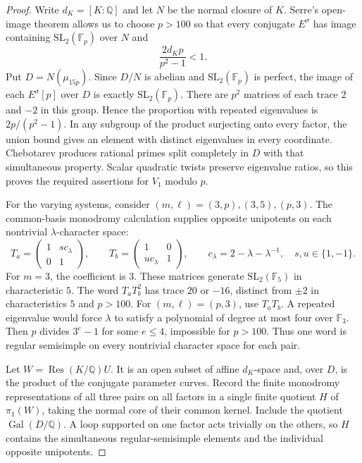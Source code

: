 \documentclass[11pt,a4paper]{article}
\numberwithin{equation}{section}
\begin{document}
\begin{proof}
Write \(d_K=[K:\mathbb Q]\) and let \(N\) be the normal closure of \(K\). Serre's open-image theorem \cite{S72} allows us to choose \(p>100\) so that every conjugate \(E^\sigma\) has image containing \(\mathrm{SL}_2(\mathbb F_p)\) over \(N\) and
\begin{equation*}
\frac{2d_Kp}{p^2-1}<1.
\end{equation*}
Put \(D=N(\mu_{15p})\). Since \(D/N\) is abelian and \(\mathrm{SL}_2(\mathbb F_p)\) is perfect, the image of each \(E^\sigma[p]\) over \(D\) is exactly \(\mathrm{SL}_2(\mathbb F_p)\). There are \(p^2\) matrices of each trace \(2\) and \(-2\) in this group. Hence the proportion with repeated eigenvalues is \(2p/(p^2-1)\). In any subgroup of the product surjecting onto every factor, the union bound gives an element with distinct eigenvalues in every coordinate. Chebotarev produces rational primes split completely in \(D\) with that simultaneous property. Scalar quadratic twists preserve eigenvalue ratios, so this proves the required assertions for \(V_1\) modulo \(p\).

For the varying systems, consider \((m,\ell)=(3,p),(3,5),(p,3)\). The common-basis monodromy calculation \cite[Theorem~4.5]{O} supplies opposite unipotents on each nontrivial \(\lambda\)-character space:
\begin{equation*}
T_a=\begin{pmatrix}1&s c_\lambda\\0&1\end{pmatrix},
\qquad T_b=\begin{pmatrix}1&0\\u c_\lambda&1\end{pmatrix},
\qquad c_\lambda=2-\lambda-\lambda^{-1},\quad s,u\in\{1,-1\}.
\end{equation*}
For \(m=3\), the coefficient is \(3\). These matrices generate \(\mathrm{SL}_2(\mathbb F_5)\) in characteristic \(5\). The word \(T_aT_b^2\) has trace \(20\) or \(-16\), distinct from \(\pm2\) in characteristics \(5\) and \(p>100\). For \((m,\ell)=(p,3)\), use \(T_aT_b\). A repeated eigenvalue would force \(\lambda\) to satisfy a polynomial of degree at most four over \(\mathbb F_3\). Then \(p\) divides \(3^e-1\) for some \(e\leq4\), impossible for \(p>100\). Thus one word is regular semisimple on every nontrivial character space for each pair.

Let \(W=\operatorname{Res}(K/\mathbb Q)U\). It is an open subset of affine \(d_K\)-space and, over \(D\), is the product of the conjugate parameter curves. Record the finite monodromy representations of all three pairs on all factors in a single finite quotient \(H\) of \(\pi_1(W)\), taking the normal core of their common kernel. Include the quotient \(\operatorname{Gal}(D/\mathbb Q)\). A loop supported on one factor acts trivially on the others, so \(H\) contains the simultaneous regular-semisimple elements and the individual opposite unipotents.


\end{proof}
\end{document}
